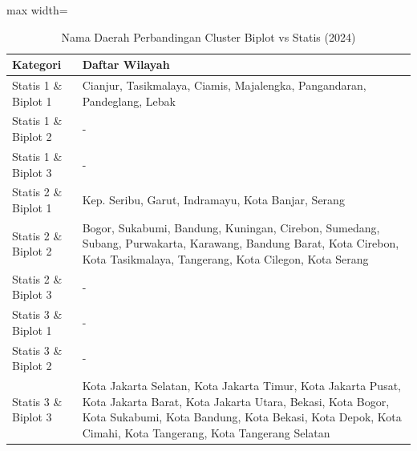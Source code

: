 \begin{table}[H]
\centering
\caption{Nama Daerah Perbandingan Cluster Biplot vs Statis (2024)} \label{tab:appbiplot_statis_name_2024}
\begin{adjustbox}{max width=\textwidth}
\begin{tabular}{|p{4cm}|p{10cm}|}
\hline
\textbf{Kategori} & \textbf{Daftar Wilayah} \\
\hline
Statis 1 \& Biplot 1 & Cianjur, Tasikmalaya, Ciamis, Majalengka, Pangandaran, Pandeglang, Lebak \\
\hline
Statis 1 \& Biplot 2 & - \\
\hline
Statis 1 \& Biplot 3 & - \\
\hline
Statis 2 \& Biplot 1 & Kep. Seribu, Garut, Indramayu, Kota Banjar, Serang \\
\hline
Statis 2 \& Biplot 2 & Bogor, Sukabumi, Bandung, Kuningan, Cirebon, Sumedang, Subang, Purwakarta, Karawang, Bandung Barat, Kota Cirebon, Kota Tasikmalaya, Tangerang, Kota Cilegon, Kota Serang \\
\hline
Statis 2 \& Biplot 3 & - \\
\hline
Statis 3 \& Biplot 1 & - \\
\hline
Statis 3 \& Biplot 2 & - \\
\hline
Statis 3 \& Biplot 3 & Kota Jakarta Selatan, Kota Jakarta Timur, Kota Jakarta Pusat, Kota Jakarta Barat, Kota Jakarta Utara, Bekasi, Kota Bogor, Kota Sukabumi, Kota Bandung, Kota Bekasi, Kota Depok, Kota Cimahi, Kota Tangerang, Kota Tangerang Selatan \\
\hline
\end{tabular}
\end{adjustbox}
\end{table}